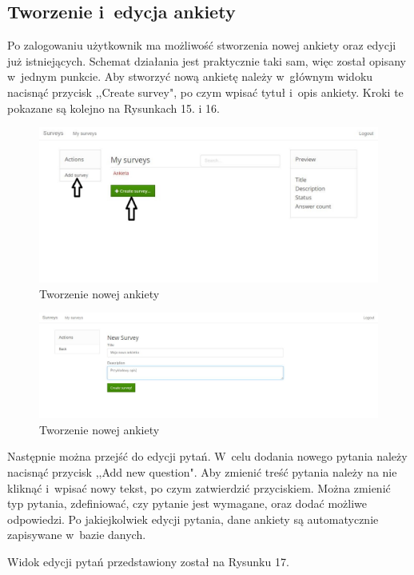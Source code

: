 \documentclass[12pt,a4paper,notitlepage]{article}
\begin{document}
\subsection{Tworzenie i~edycja ankiety}
Po zalogowaniu użytkownik ma możliwość stworzenia nowej ankiety oraz edycji już istniejących. Schemat działania jest praktycznie taki sam, więc został opisany w~jednym punkcie. Aby stworzyć nową ankietę należy w~głównym widoku nacisnąć przycisk ,,Create survey", po czym wpisać tytuł i~opis ankiety. Kroki te pokazane są kolejno na Rysunkach 15. i 16.

\begin{figure}[H]
    \centering
    \includegraphics[width=\linewidth]{obrazy/newSurvey}
    \caption{Tworzenie nowej ankiety}
\end{figure} 

\begin{figure}[H]
    \centering
    \includegraphics[width=\linewidth]{obrazy/edycjaBasic}
    \caption{Tworzenie nowej ankiety}
\end{figure} 

Następnie można przejść do edycji pytań. W~celu dodania nowego pytania należy nacisnąć przycisk ,,Add new question". Aby zmienić treść pytania należy na nie kliknąć i~wpisać nowy tekst, po czym zatwierdzić przyciskiem. Można zmienić typ pytania, zdefiniować, czy pytanie jest wymagane, oraz dodać możliwe odpowiedzi. Po jakiejkolwiek edycji pytania, dane ankiety są automatycznie zapisywane w~bazie danych.
\par Widok edycji pytań przedstawiony został na Rysunku 17.
\end{document}
